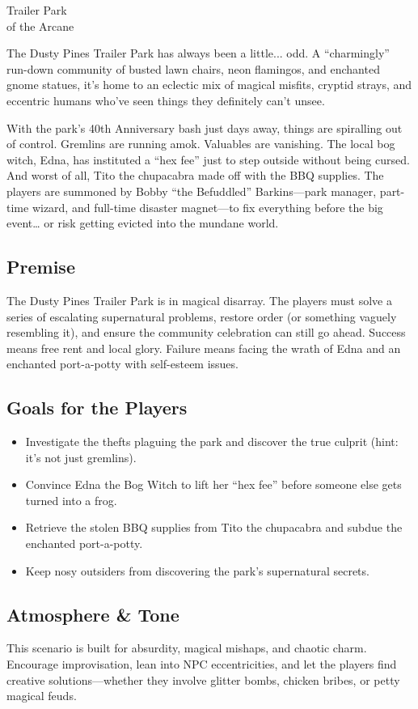 \begin{WyrdScenarioHeading}{Trailer Park\\ of the Arcane}
    \label{scenario:trailer-park-arcane}

    The Dusty Pines Trailer Park has always been a little... odd. A “charmingly” run-down community of busted lawn chairs, neon flamingos, and enchanted gnome statues, it’s home to an eclectic mix of magical misfits, cryptid strays, and eccentric humans who’ve seen things they definitely can’t unsee.

    With the park’s 40th Anniversary bash just days away, things are spiralling out of control. Gremlins are running amok. Valuables are vanishing. The local bog witch, Edna, has instituted a “hex fee” just to step outside without being cursed. And worst of all, Tito the chupacabra made off with the BBQ supplies. The players are summoned by Bobby “the Befuddled” Barkins—park manager, part-time wizard, and full-time disaster magnet—to fix everything before the big event… or risk getting evicted into the mundane world.

    \subsection*{Premise}
    The Dusty Pines Trailer Park is in magical disarray. The players must solve a series of escalating supernatural problems, restore order (or something vaguely resembling it), and ensure the community celebration can still go ahead. Success means free rent and local glory. Failure means facing the wrath of Edna and an enchanted port-a-potty with self-esteem issues.

    \subsection*{Goals for the Players}
    \begin{itemize}
        \item Investigate the thefts plaguing the park and discover the true culprit (hint: it's not just gremlins).
        \item Convince Edna the Bog Witch to lift her “hex fee” before someone else gets turned into a frog.
        \item Retrieve the stolen BBQ supplies from Tito the chupacabra and subdue the enchanted port-a-potty.
        \item Keep nosy outsiders from discovering the park's supernatural secrets.
    \end{itemize}

    \subsection*{Atmosphere \& Tone}
    This scenario is built for absurdity, magical mishaps, and chaotic charm. Encourage improvisation, lean into NPC eccentricities, and let the players find creative solutions—whether they involve glitter bombs, chicken bribes, or petty magical feuds.

\end{WyrdScenarioHeading}

